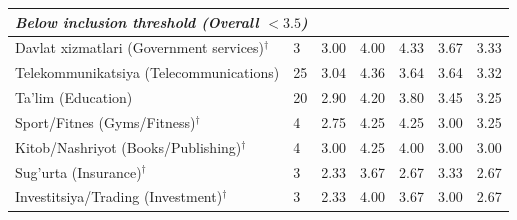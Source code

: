 \documentclass[computers,article,submit,pdftex,moreauthors]{Definitions/mdpi}
\begin{document}
\begin{table}[H]
\begin{tabular}{llccccc}
\midrule
\multicolumn{7}{l}{\textit{Below inclusion threshold (Overall $< 3.5$)}} \\
\midrule
Davlat xizmatlari (Government services)$^\dagger$ & 3 & 3.00 & 4.00 & 4.33 & 3.67 & 3.33 \\
Telekommunikatsiya (Telecommunications)       & 25 & 3.04 & 4.36 & 3.64 & 3.64 & 3.32 \\
Ta'lim (Education)                            & 20 & 2.90 & 4.20 & 3.80 & 3.45 & 3.25 \\
Sport/Fitnes (Gyms/Fitness)$^\dagger$          & 4  & 2.75 & 4.25 & 4.25 & 3.00 & 3.25 \\
Kitob/Nashriyot (Books/Publishing)$^\dagger$  & 4  & 3.00 & 4.25 & 4.00 & 3.00 & 3.00 \\
Sug'urta (Insurance)$^\dagger$                & 3  & 2.33 & 3.67 & 2.67 & 3.33 & 2.67 \\
Investitsiya/Trading (Investment)$^\dagger$   & 3  & 2.33 & 4.00 & 3.67 & 3.00 & 2.67 \\
\bottomrule
\end{tabular}
\end{table}
\end{document}
